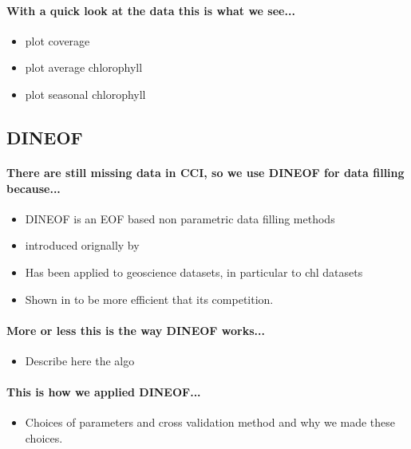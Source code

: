 \paragraph{With a quick look at the data this is what we see...}

\begin{itemize}
  \item plot coverage
  \item plot average chlorophyll
  \item plot seasonal chlorophyll
\end{itemize}

\subsection{DINEOF}

\paragraph{There are still missing data in CCI, so we use DINEOF for
data filling because...}

\begin{itemize}
  \item DINEOF is an EOF based non parametric data filling methods
  \item introduced orignally by \citet{Beckers2003}
  \item Has been applied to geoscience datasets, in particular to
chl datasets
  \item Shown in \citet{Taylor2013} to be more efficient that its
competition.
\end{itemize}

\paragraph{More or less this is the way DINEOF works...}

\begin{itemize}
  \item Describe here the algo
\end{itemize}

\paragraph{This is how we applied DINEOF...}

\begin{itemize}
  \item Choices of parameters and cross validation method and why we
made these choices.
\end{itemize}

